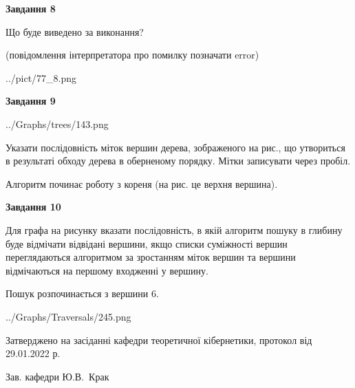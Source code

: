 \documentclass[12pt, ukrainian]{article}
\begin{document}
{\begin {large}
{\begin {center}\textbf{Завдання 8}\end {center}}\par
Що буде виведено за виконання?\par
 (повідомлення інтерпретатора про помилку позначати error)\par
\begin{center}
	{../pict/77_8.png}
\end{center}
\newpage

{\begin {center}\textbf{Завдання 9}\end {center}}\par

\begin{center}
	{../Graphs/trees/143.png}
\end{center}
Указати послідовність міток вершин дерева, зображеного на рис., що утвориться в результаті обходу дерева в оберненому порядку. Мітки записувати через пробіл.\par Алгоритм починає роботу з кореня (на рис. це верхня вершина).\par
\newpage

{\begin {center}\textbf{Завдання 10}\end {center}}\par
Для графа на рисунку вказати послідовність, в якій алгоритм пошуку в глибину буде відмічати відвідані вершини, якщо списки суміжності вершин переглядаються алгоритмом за зростанням міток вершин та вершини відмічаються на першому вход\-женні у вершину.\par
Пошук розпочинається з вершини 6.\par

\begin{center}
	{../Graphs/Traversals/245.png}
\end{center}\par
\newpage


\end {large}
}
{\smallskip \begin {small} Затверджено на засіданні кафедри теоретичної кібернетики, протокол  від   29.01.2022 р.\par\smallskip\smallskip
{\parbox {6.5 cm}{Зав. кафедри \dotfill Ю.В.~Крак}} \end{small}}
\end{document}
